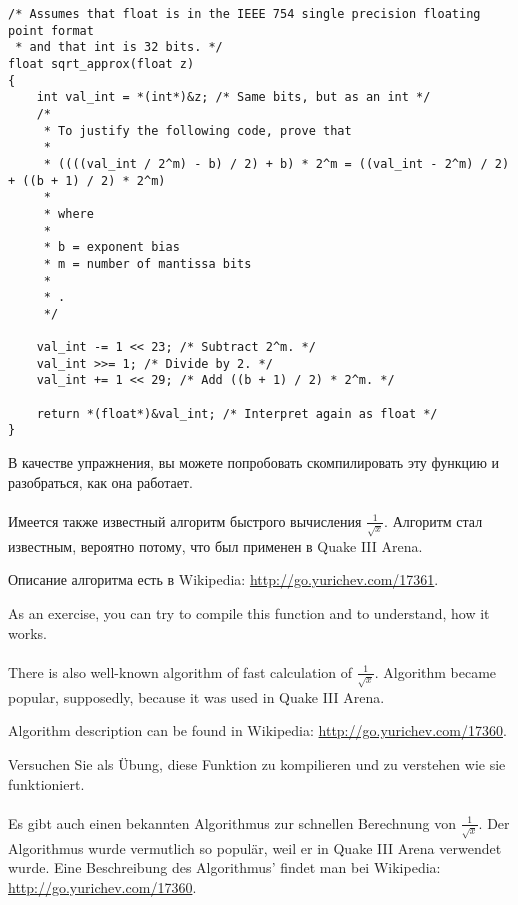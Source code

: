 \begin{lstlisting}[caption=\DE{Quellcode stammt aus der Wikipedia}\EN{The source code is taken from
Wikipedia}\RU{Исходный код взят из Wikipedia}\FR{Le code source provient de Wikipedia}\JA{ソースコードはウィキペディアから取りました}:
\url{http://go.yurichev.com/17364},style=customc] /* Assumes that float is in the IEEE 754 single precision floating point format
 * and that int is 32 bits. */
float sqrt_approx(float z)
{
    int val_int = *(int*)&z; /* Same bits, but as an int */
    /*
     * To justify the following code, prove that
     *
     * ((((val_int / 2^m) - b) / 2) + b) * 2^m = ((val_int - 2^m) / 2) + ((b + 1) / 2) * 2^m)
     *
     * where
     *
     * b = exponent bias
     * m = number of mantissa bits
     *
     * .
     */
 
    val_int -= 1 << 23; /* Subtract 2^m. */
    val_int >>= 1; /* Divide by 2. */
    val_int += 1 << 29; /* Add ((b + 1) / 2) * 2^m. */
 
    return *(float*)&val_int; /* Interpret again as float */
}
\end{lstlisting}

\ifdefined\RUSSIAN
В качестве упражнения, вы можете попробовать скомпилировать эту функцию и разобраться, как она работает. \\
\\
Имеется также известный алгоритм быстрого вычисления $\frac{1}{\sqrt{x}}$.
Алгоритм стал известным, вероятно потому, что был применен в Quake III Arena.

Описание алгоритма есть в Wikipedia: \url{http://go.yurichev.com/17361}.
\fi %

\ifdefined\ENGLISH
As an exercise, you can try to compile this function and to understand, how it works. \\
\\
There is also well-known algorithm of fast calculation of $\frac{1}{\sqrt{x}}$.
Algorithm became popular, supposedly, because it was used in Quake III Arena.

Algorithm description can be found in Wikipedia: \url{http://go.yurichev.com/17360}.
\fi %

\ifdefined\GERMAN
Versuchen Sie als Übung, diese Funktion zu kompilieren und zu verstehen wie sie funktioniert.\\\\
Es gibt auch einen bekannten Algorithmus zur schnellen Berechnung von $\frac{1}{\sqrt{x}}$.
Der Algorithmus wurde vermutlich so populär, weil er in Quake III Arena verwendet wurde.
Eine Beschreibung des Algorithmus' findet man bei Wikipedia: \url{http://go.yurichev.com/17360}.
\fi %

